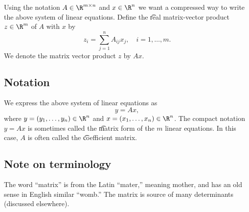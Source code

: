 Using the notation $A \in \R ^{m \times  n}$ and $x \in \R ^n$ we want a compressed way to write the above system of linear equations.
Define the \t{real matrix-vector product} $z \in \R ^m$ of $A$ with $x$ by
\[
z_{i} = \sum_{j = 1}^{n} A_{ij}x_j, \quad i = 1, \dots , m.
\]
We denote the matrix vector product $z$ by $Ax$.

\subsection*{Notation}

We express the above system of linear equations as
\[
y = Ax,
\]
where $y = (y_1, \dots , y_n) \in \R ^{n}$ and $x = (x_1, \dots , x_n) \in \R ^n$.
The compact notation $y = Ax$ is sometimes called the \t{matrix form} of the $m$ linear equations.
In this case, $A$ is often called the \t{coefficient matrix}.

\subsection*{Note on terminology}

The word ``matrix'' is from the Latin ``mater,'' meaning mother, and has an old sense in English similar ``womb.''
The matrix is source of many determinants (discussed elsewhere).
